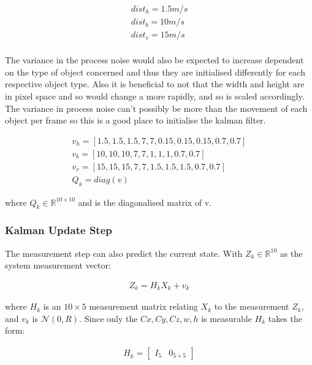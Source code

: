 \documentclass[11pt,twoside]{report}
\begin{document}
\begin{equation}
\begin{aligned}
dist_{h} = 1.5m/s \\
dist_{b} = 10 m/s \\
dist_{v} = 15 m/s \\
\end{aligned}
\end{equation}

The variance in the process noise would also be expected to increase dependent on the type of object concerned and thus they are initialised differently for each respective object type. Also it is beneficial to not that the width and height are in pixel space and so would change a more rapidly, and so is scaled accordingly. The variance in process noise can't possibly be more than the movement of each object per frame so this is a good place to initialise the kalman filter.

\begin{equation}
\begin{aligned}
v_{h} = [1.5,1.5,1.5,7,7,0.15,0.15,0.15,0.7,0.7] \\
v_{b} = [10,10,10,7,7,1,1,1,0.7,0.7] \\
v_{v} = [15,15,15,7,7,1.5,1.5,1.5,0.7,0.7] \\
Q_{k} = diag(v)
\end{aligned}
\end{equation}

where $Q_{k} \in \mathbb{R}^{10 \times 10}$ and is the diagonalised matrix of v.

\subsubsection{Kalman Update Step}

The measurement step can also predict the current state. With $Z_{k} \in \mathbb{R}^{10}$ as the system measurement vector:

\begin{equation}
\begin{aligned}
Z_{k} =  H_{k} X_{k} + v_{k}
\end{aligned}
\end{equation}

where $H_{k}$ is an $10 \times 5$ measurement matrix relating $X_{k}$ to the measurement $Z_{k}$, and $v_{k}$ is $\mathcal{N}(0,R)$. Since only the $Cx,Cy,Cz,w,h$ is measurable $H_{k}$ takes the form:

\begin{equation}
\begin{aligned}
H_{k} = 
\begin{bmatrix}
I_{5} &  0_{5 \times 5}
\end{bmatrix}
\end{aligned}
\end{equation}
\end{document}
